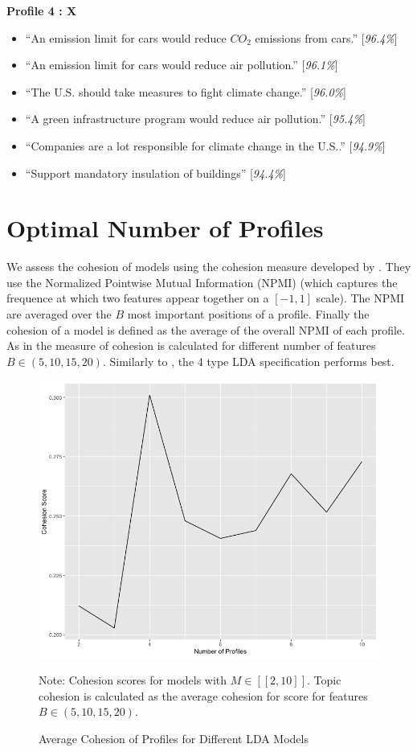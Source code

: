 \documentclass{article}
\begin{document}
\textbf{Profile 4 : X}
\begin{itemize}
\item ``An emission limit for cars would reduce $CO_2$ emissions from cars.'' [\textit{96.4\%}]
\item ``An emission limit for cars would reduce air pollution.'' [\textit{96.1\%}]
\item ``The U.S. should take measures to fight climate change.'' [\textit{96.0\%}]
\item ``A green infrastructure program would reduce air pollution.'' [\textit{95.4\%}]
\item ``Companies are a lot responsible for climate change in the U.S..'' [\textit{94.9\%}]
\item ``Support mandatory insulation of buildings'' [\textit{94.4\%}]
\end{itemize}

\section{Optimal Number of Profiles}
We assess the cohesion of models using the cohesion measure developed by \cite{draca2020polarized}. They use the Normalized Pointwise Mutual Information (NPMI) \citep{bouma2009normalized} (which captures the frequence at which two features appear together on a $[-1,1]$ scale). The NPMI are averaged over the $B$ most important positions of a profile. Finally the cohesion of a model is defined as the average of the overall NPMI of each profile.
As in \cite{lau2016sensitivity} the measure of cohesion is calculated for different number of features $B \in (5,10,15,20)$. Similarly to \cite{draca2020polarized}, the 4 type LDA specification performs best.

\begin{figure}[h!]
\caption{Average Cohesion of Profiles for Different LDA Models}
\begin{center}
\includegraphics[width=.8\textwidth]{cohesion_score.png}
\end{center}
{\footnotesize Note: Cohesion scores for models with $M \in [\![2,10]\!]$. Topic cohesion is calculated as the average cohesion for score for features $B \in (5,10,15,20)$.}
\end{figure}
\end{document}
